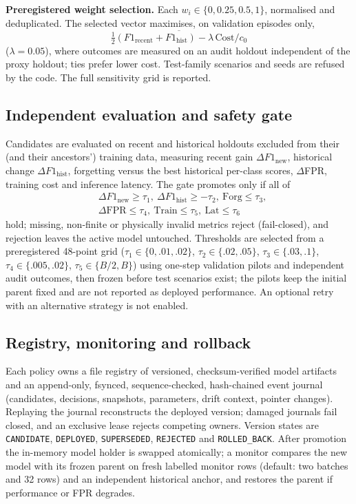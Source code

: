 \documentclass[conference]{IEEEtran}
\begin{document}
\textbf{Preregistered weight selection.} Each $w_i\in\{0,0.25,0.5,1\}$, normalised and deduplicated. The selected vector maximises, on validation episodes only,
\begin{equation}
\overline{\tfrac12(F1_{\text{recent}}+F1_{\text{hist}})-\lambda\,\text{Cost}/c_0}
\end{equation}
($\lambda{=}0.05$), where outcomes are measured on an audit holdout independent of the proxy holdout; ties prefer lower cost. Test-family scenarios and seeds are refused by the code. The full sensitivity grid is reported.

\subsection{Independent evaluation and safety gate}
\label{sec:gate}
Candidates are evaluated on recent and historical holdouts excluded from their (and their ancestors') training data, measuring recent gain $\Delta F1_{\text{new}}$, historical change $\Delta F1_{\text{hist}}$, forgetting versus the best historical per-class scores, $\Delta$FPR, training cost and inference latency. The gate promotes only if all of
\begin{equation}
\begin{aligned}
&\Delta F1_{\text{new}}\ge\tau_1,\ \Delta F1_{\text{hist}}\ge-\tau_2,\ \text{Forg}\le\tau_3,\\
&\Delta\text{FPR}\le\tau_4,\ \text{Train}\le\tau_5,\ \text{Lat}\le\tau_6
\end{aligned}
\end{equation}
hold; missing, non-finite or physically invalid metrics reject (fail-closed), and rejection leaves the active model untouched. Thresholds are selected from a preregistered 48-point grid ($\tau_1\!\in\!\{0,.01,.02\}$, $\tau_2\!\in\!\{.02,.05\}$, $\tau_3\!\in\!\{.03,.1\}$, $\tau_4\!\in\!\{.005,.02\}$, $\tau_5\!\in\!\{B/2,B\}$) using one-step validation pilots and independent audit outcomes, then frozen before test scenarios exist; the pilots keep the initial parent fixed and are not reported as deployed performance. An optional retry with an alternative strategy is not enabled.

\subsection{Registry, monitoring and rollback}
Each policy owns a file registry of versioned, checksum-verified model artifacts and an append-only, fsynced, sequence-checked, hash-chained event journal (candidates, decisions, snapshots, parameters, drift context, pointer changes). Replaying the journal reconstructs the deployed version; damaged journals fail closed, and an exclusive lease rejects competing owners. Version states are \texttt{CANDIDATE}, \texttt{DEPLOYED}, \texttt{SUPERSEDED}, \texttt{REJECTED} and \texttt{ROLLED\_BACK}. After promotion the in-memory model holder is swapped atomically; a monitor compares the new model with its frozen parent on fresh labelled monitor rows (default: two batches and 32 rows) and an independent historical anchor, and restores the parent if performance or FPR degrades.
\end{document}
